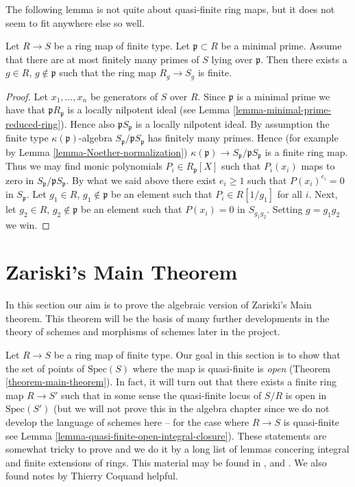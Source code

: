 \noindent
The following lemma is not quite about quasi-finite ring maps, but
it does not seem to fit anywhere else so well.

\begin{lemma}
\label{lemma-generically-finite}
Let $R \to S$ be a ring map of finite type.
Let $\mathfrak p \subset R$ be a minimal prime.
Assume that there are at most finitely many primes of $S$
lying over $\mathfrak p$. Then there exists a
$g \in R$, $g \not \in \mathfrak p$ such that the
ring map $R_g \to S_g$ is finite.
\end{lemma}

\begin{proof}
Let $x_1, \ldots, x_n$ be generators of $S$ over $R$.
Since $\mathfrak p$ is a minimal prime we have that
$\mathfrak pR_{\mathfrak p}$ is a locally nilpotent ideal
(see Lemma \ref{lemma-minimal-prime-reduced-ring}).
Hence also $\mathfrak pS_{\mathfrak p}$ is a locally nilpotent ideal.
By assumption the finite type $\kappa(\mathfrak p)$-algebra
$S_{\mathfrak p}/\mathfrak pS_{\mathfrak p}$ has finitely many
primes. Hence (for example by
Lemma \ref{lemma-Noether-normalization})
$\kappa(\mathfrak p) \to S_{\mathfrak p}/\mathfrak pS_{\mathfrak p}$
is a finite ring map. Thus we may find monic polynomials
$P_i \in R_{\mathfrak p}[X]$ such that $P_i(x_i)$ maps to zero
in $S_{\mathfrak p}/\mathfrak pS_{\mathfrak p}$. By what we said
above there exist $e_i \geq 1$ such that $P(x_i)^{e_i} = 0$
in $S_{\mathfrak p}$. Let $g_1 \in R$, $g_1 \not \in \mathfrak p$
be an element such that $P_i \in R[1/g_1]$ for all $i$.
Next, let $g_2 \in R$, $g_2 \not \in \mathfrak p$ be an element
such that $P(x_i) = 0$ in $S_{g_1g_2}$. Setting $g = g_1g_2$
we win.
\end{proof}







\section{Zariski's Main Theorem}
\label{section-Zariski}

\noindent
In this section our aim is to prove the algebraic version of
Zariski's Main theorem. This theorem will be the basis of many
further developments in the theory of schemes and morphisms of
schemes later in the project.

\medskip\noindent
Let $R \to S$ be a ring map of finite type.
Our goal in this section is to show that the set
of points of $\text{Spec}(S)$ where the map is quasi-finite
is {\it open} (Theorem \ref{theorem-main-theorem}).
In fact, it will turn out that there exists
a finite ring map $R \to S'$ such that in some sense the quasi-finite
locus of $S/R$ is open in $\text{Spec}(S')$
(but we will not prove this in the algebra chapter since we do not
develop the language of schemes here -- for the case where $R \to S$
is quasi-finite see Lemma \ref{lemma-quasi-finite-open-integral-closure}).
These statements are somewhat tricky to prove and
we do it by a long list of lemmas concering integral and
finite extensions of rings. This material may be found
in \cite{Henselian}, and \cite{Peskine}. We also found notes
by Thierry Coquand helpful.


